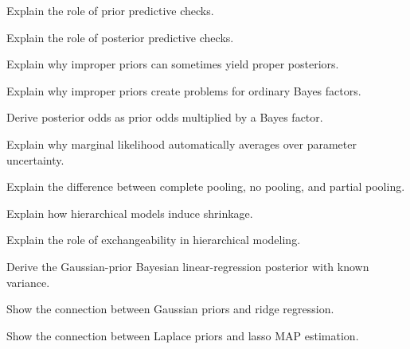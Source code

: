 \begin{exercise}[3]
Explain the role of prior predictive checks.
\end{exercise}

\begin{exercise}[3]
Explain the role of posterior predictive checks.
\end{exercise}

\begin{exercise}[3]
Explain why improper priors can sometimes yield proper posteriors.
\end{exercise}

\begin{exercise}[3]
Explain why improper priors create problems for ordinary Bayes factors.
\end{exercise}

\begin{exercise}[3]
Derive posterior odds as prior odds multiplied by a Bayes factor.
\end{exercise}

\begin{exercise}[3]
Explain why marginal likelihood automatically averages over parameter
uncertainty.
\end{exercise}

\begin{exercise}[3]
Explain the difference between complete pooling, no pooling, and partial
pooling.
\end{exercise}

\begin{exercise}[3]
Explain how hierarchical models induce shrinkage.
\end{exercise}

\begin{exercise}[3]
Explain the role of exchangeability in hierarchical modeling.
\end{exercise}

\begin{exercise}[3]
Derive the Gaussian-prior Bayesian linear-regression posterior with known
variance.
\end{exercise}

\begin{exercise}[3]
Show the connection between Gaussian priors and ridge regression.
\end{exercise}

\begin{exercise}[3]
Show the connection between Laplace priors and lasso MAP estimation.
\end{exercise}

